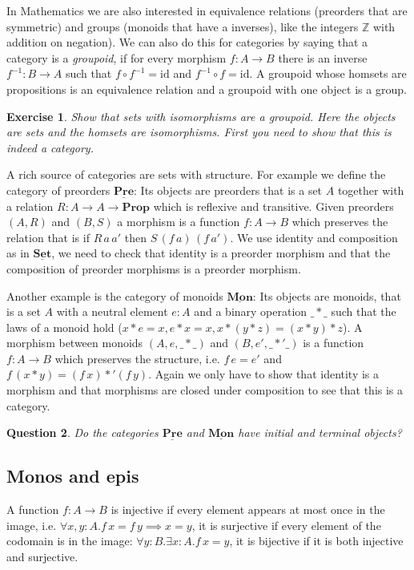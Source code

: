 \documentclass{article}
\newcommand{\Prop}{\mathbf{Prop}}
\newcommand{\cat}[1]{\underline{\mathbf{#1}}}
\newcommand{\id}{\mathrm{id}}
\newcommand{\Int}{\mathbb{Z}}
\newtheorem{exercise}{Exercise}
\newtheorem{question}[exercise]{Question}
\begin{document}
In Mathematics we are also interested in equivalence relations (preorders that are symmetric) and groups (monoids that have a inverses), like the integers $\Int$ with addition on negation). We can also do this for categories by saying that a category is a \emph{groupoid}, if for every morphism $f : A \to B$ there is an inverse $f^{-1} : B \to A$ such that $f \circ f^{-1} = \id$ and $f^{-1} \circ f = \id$. A groupoid whose homsets are propositions is an equivalence relation and a groupoid with one object is a group.

\begin{exercise}
  Show that  sets with isomorphisms are a groupoid. Here the objects are sets and the homsets are isomorphisms. First you need to show that this is indeed a category.
\end{exercise}

A rich source of categories are sets with structure. For example we define the category of preorders $\cat{Pre}$: Its objects are preorders that is a set $A$ together with a relation $R : A \to A \to \Prop$ which is reflexive and transitive. Given preorders $(A,R)$ and $(B,S)$ a morphism is a function $f : A \to B$ which preserves the relation that is if $R\,a\,a'$ then $S\,(f\,a)\,(f\,a')$. We use identity and composition as in $\cat{Set}$, we need to check that identity is a preorder morphism and that the composition of preorder morphisms is a preorder morphism.

Another example is the category of monoids $\cat{Mon}$: Its objects are monoids, that is a set $A$ with a neutral element $e:A$ and a binary operation $\_*\_$ such that the laws of a monoid hold ($x*e=x, e*x=x, x*(y*z) = (x*y)*z$). A morphism between monoids $(A,e, \_*\_)$ and $(B,e',\_*'\_)$ is a function $f : A \to B$ which preserves the structure, i.e. $f\,e = e'$ and $f\,(x * y) = (f\,x) *' (f\, y)$. Again we only have to show that identity is a morphism and that morphisms are closed under composition to see that this is a category.

\begin{question}
  Do the categories $\cat{Pre}$ and $\cat{Mon}$ have initial and terminal objects?
\end{question}

\subsection{Monos and epis}
\label{sec:monos-epis}

A function $f:A\to B$ is injective if every element appears at most once in the image, i.e. $\forall x,y:A.f\,x = f\,y \implies x = y$, it is surjective if every element of the codomain is in the image: $\forall y:B.\exists x:A.f\,x = y$, it is bijective if it is both injective and surjective. 
\end{document}
